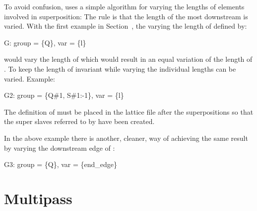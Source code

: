 To avoid confusion, \bmad uses a simple algorithm for varying the
lengths of elements involved in superposition: The rule is that the
length of the most downstream  is varied.
With the first example in Section~, the  
varying the length of  defined by:
\begin{example}
  G: group = \{Q\}, var = \{l\}
\end{example}
would vary the length of  which would result in an equal
variation of the length of . To keep the length of 
invariant while varying  the individual  lengths
can be varied. Example:
\begin{example}
  G2: group = \{Q{\#}1, S{\#}1:-1\}, var = \{l\}
\end{example}
The definition of  must be placed in the lattice file after the
superpositions so that the super slaves referred to by  have
been created. 

In the above example there is another, cleaner, way of achieving
the same result by varying the downstream edge of :
\begin{example}
  G3: group = \{Q\}, var = \{end_edge\}
\end{example}

\section{Multipass}
\label{s:multipass}

